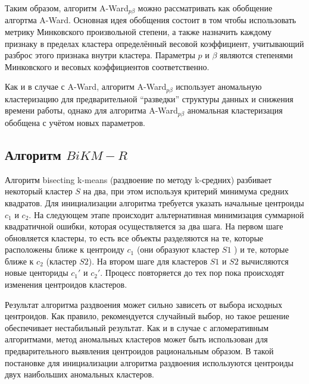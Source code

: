 \documentclass[12pt,twoside,a4paper,tikz,border=5]{refart}
\begin{document}
Таким образом, алгоритм  A-Ward$_{p\beta} $ можно рассматривать как обобщение алгортма A-Ward. Основная идея обобщения состоит в том чтобы использовать метрику Минковского произвольной степени, а также назначить каждому признаку в пределах кластера определённый весовой коэффициент, учитывающий разброс этого признака внутри кластера. Параметры $ p $ и $ \beta $ являются степенями Минковского и весовых коэффициентов соответственно.

 Как и в случае с A-Ward, алгоритм A-Ward$_{p\beta} $ использует аномальную кластеризацию для предварительной ``разведки'' структуры данных и снижения времени работы, однако для алгоритма A-Ward$_{p\beta} $ аномальная кластеризация обобщена с учётом новых параметров.
 

\subsection{Алгоритм $ BiKM-R $}
	
Алгоритм bisecting k-means (раздвоение по методу k-средних) разбивает некоторый кластер $ S $ на два, при этом используя критерий минимума средних квадратов. Для инициализации алгоритма требуется указать начальные центроиды $ c_{1} $ и $ c_{2} $. На следующем этапе происходит альтернативная минимизация суммарной квадратичной ошибки, которая осуществляется за два шага. На первом шаге обновляется кластеры, то есть все объекты разделяются на те, которые расположены ближе к центроиду $ c_{1} $ (они образуют кластер $ S1 $ ) и те, которые ближе к $ c_{2} $ (кластер $ S2 $). На втором шаге для кластеров $ S1 $ и $ S2 $ вычисляются новые центориды $ c_{1}' $ и $ c_{2}' $. Процесс повторяется до тех пор пока происходят изменения центроидов кластеров. 

Результат алгоритма раздвоения может сильно зависеть от выбора исходных центроидов. Как правило, рекомендуется случайный выбор, но такое решение обеспечивает нестабильный результат. Как и в случае с агломеративным алгоритмами, метод аномальных кластеров может быть использован для предварительного выявления центроидов рациональным образом.  В такой постановке для инициализации алгоритма раздвоения используются центроиды двух наибольших аномальных кластеров. 
\end{document}

